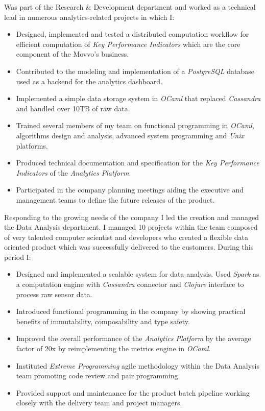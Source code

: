 \documentclass{resume}
\begin{document}
Was part of the Research \& Development department and worked as a technical lead in numerous analytics-related projects in which I:
\begin{itemize}
  \item Designed, implemented and tested a distributed computation workflow for efficient computation of {\em Key Performance Indicators} which are the core component of the Movvo's business.
  \item Contributed to the modeling and implementation of a {\em PostgreSQL} database used as a backend for the analytics dashboard.
  \item Implemented a simple data storage system in {\em OCaml} that replaced {\em Cassandra} and handled over 10TB of raw data.
  \item Trained several members of my team on functional programming in {\em OCaml}, algorithms design and analysis, advanced system programming and {\em Unix} platforms.
  \item Produced technical documentation and specification for the {\em Key Performance Indicators} of the {\em Analytics Platform}.
  \item Participated in the company planning meetings aiding the executive and management teams to define the future releases of the product.
\end{itemize}

Responding to the growing needs of the company I led the creation and managed the Data Analysis department. I managed 10 projects within the team composed of very talented computer scientist and developers who created a flexible data oriented product which was successfully delivered to the customers. During this period I:
\begin{itemize}
  \item Designed and implemented a scalable system for data analysis. Used {\em Spark} as a computation engine with {\em Cassandra} connector and {\em Clojure} interface to process raw sensor data.
  \item Introduced functional programming in the company by showing practical benefits of immutability, composability and type safety.
  \item Improved the overall performance of the {\em Analytics Platform} by the average factor of 20x by reimplementing the metrics engine in {\em OCaml}.
  \item Instituted {\em Extreme Programming} agile methodology within the Data Analysis team promoting code review and pair programming.
  \item Provided support and maintenance for the product batch pipeline working closely with the delivery team and project managers.
\end{itemize}
\end{document}
